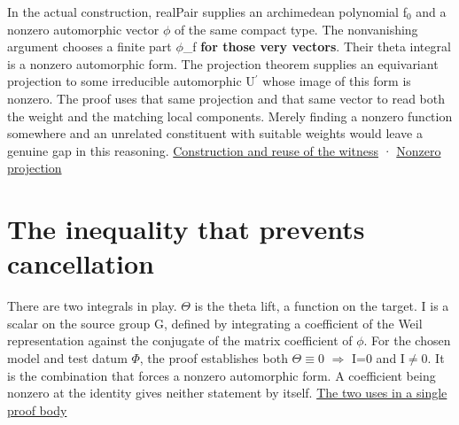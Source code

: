 \documentclass[11pt,letterpaper]{article}
\begin{document}
In the actual construction, {\ttfamily\small realPair} supplies an archimedean polynomial f\ensuremath{{}_{0}} and a nonzero automorphic vector \ensuremath{\phi} of the same compact type. The nonvanishing argument chooses a finite part \ensuremath{\phi}\_f \textbf{for those very vectors}. Their theta integral is a nonzero automorphic form. The projection theorem supplies an equivariant projection to some irreducible automorphic U\ensuremath{{}^{\prime}} whose image of this form is nonzero. The proof uses that same projection and that same vector to read both the weight and the matching local components. Merely finding a nonzero function somewhere and an unrelated constituent with suitable weights would leave a genuine gap in this reasoning. \href{https://github.com/nousentllc/riemann-hypothesis/blob/40e56bab026552e089d7afcfeff08d2defb9c005/src/Development/AutomorphicArithmetic/Foundations/GaloisRepresentations/ThetaParseval/ThetaKernels/GalTPDefs.lean\#L158-L177}{Construction and reuse of the witness} · \href{https://github.com/nousentllc/riemann-hypothesis/blob/40e56bab026552e089d7afcfeff08d2defb9c005/src/Development/AutomorphicArithmetic/Foundations/GaloisRepresentations/ThetaParseval/BlockDeterminants/ProjEx.lean\#L98-L119}{Nonzero projection}

\section{The inequality that prevents cancellation}
There are two integrals in play. \ensuremath{\Theta} is the theta lift, a function on the target. I is a scalar on the source group G, defined by integrating a coefficient of the Weil representation against the conjugate of the matrix coefficient of \ensuremath{\phi}. For the chosen model and test datum \ensuremath{\Phi}, the proof establishes both \ensuremath{\Theta}\ensuremath{\equiv}0 \ensuremath{\Rightarrow} I=0 and I\ensuremath{\ne}0. It is the combination that forces a nonzero automorphic form. A coefficient being nonzero at the identity gives neither statement by itself. \href{https://github.com/nousentllc/riemann-hypothesis/blob/40e56bab026552e089d7afcfeff08d2defb9c005/src/Development/AutomorphicArithmetic/Foundations/GaloisRepresentations/ThetaParseval/ThetaKernels/TPGNonVan.lean\#L116-L151}{The two uses in a single proof body}
\end{document}
